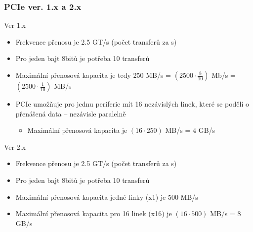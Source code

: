 \documentclass{beamer}
\begin{document}
\begin{frame}
\frametitle{PCIe ver. 1.x a 2.x}

Ver 1.x
\begin{itemize}
\item Frekvence přenosu je 2.5 GT/s (počet transferů za s)
\item Pro jeden bajt 8bitů je potřeba 10 transferů
\item Maximální přenosová kapacita je tedy 250 MB/s = $(2500 \cdot \frac{8}{10})$ Mb/s = $(2500 \cdot \frac{1}{10})$ MB/s
\item PCIe umožňuje pro jednu periferie mít 16 nezávislých linek, které se podělí o přenášená data -- nezávisle paralelně
\begin{itemize}
\item Maximální přenosová kapacita je $(16 \cdot 250)$ MB/s = $4$ GB/s
\end{itemize}
\end{itemize}

Ver 2.x
\begin{itemize}
\item Frekvence přenosu je 2.5 GT/s (počet transferů za s)
\item Pro jeden bajt 8bitů je potřeba 10 transferů
\item Maximální přenosová kapacita jedné linky (x1) je 500 MB/s
\item Maximální přenosová kapacita pro 16 linek (x16) je $(16 \cdot 500)$ MB/s = $8$ GB/s
\end{itemize}
\end{frame}
\end{document}
